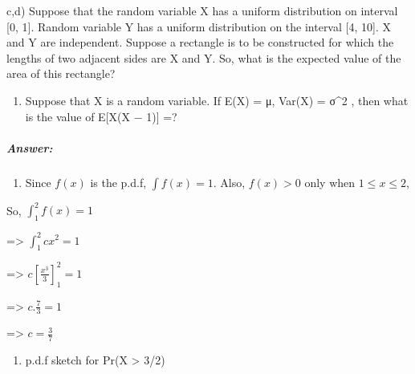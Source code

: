 \documentclass[11pt]{article}
\providecommand{\tightlist}{%
      \setlength{\itemsep}{0pt}\setlength{\parskip}{0pt}}
\begin{document}
c,d) Suppose that the random variable X has a uniform distribution on
interval {[}0, 1{]}. Random variable Y has a uniform distribution on the
interval {[}4, 10{]}. X and Y are independent. Suppose a rectangle is to
be constructed for which the lengths of two adjacent sides are X and Y.
So, what is the expected value of the area of this rectangle?

\begin{enumerate}
\def\labelenumi{\alph{enumi})}
\setcounter{enumi}{4}
\tightlist
\item
  Suppose that X is a random variable. If E(X) = μ, Var(X) = σ\^{}2 ,
  then what is the value of E{[}X(X − 1){]} =?
\end{enumerate}

    \hypertarget{answer}{%
\subparagraph{Answer:}\label{answer}}

\begin{enumerate}
\def\labelenumi{\alph{enumi})}
\tightlist
\item
  Since \(f(x)\) is the p.d.f, \(\int f(x) = 1\). Also, \(f(x) > 0\)
  only when \(1 \leq x \leq 2\),
\end{enumerate}

So, \(\int_1 ^ 2 f(x) = 1\)

=\textgreater{} \(\int_1 ^ 2 c x^2 = 1\)

=\textgreater{} \(c[\frac{x^3}{3}]_1^2 = 1\)

=\textgreater{} \(c . \frac{7}{3} = 1\)

=\textgreater{} \(c = \frac{3}{7}\)

    \begin{enumerate}
\def\labelenumi{\alph{enumi})}
\setcounter{enumi}{1}
\tightlist
\item
  p.d.f sketch for Pr(X \textgreater{} 3/2)
\end{enumerate}
\end{document}
